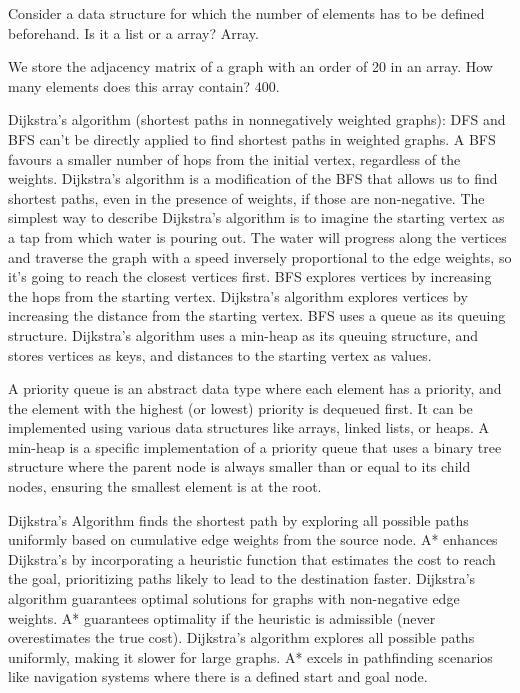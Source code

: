 Consider a data structure for which the number of elements has to be defined beforehand. Is it a list or a array? Array.

We store the adjacency matrix of a graph with an order of 20 in an array. How many elements does this array contain? $400$.

Dijkstra's algorithm (shortest paths in nonnegatively weighted graphs):
DFS and BFS can't be directly applied to find shortest paths in weighted graphs.
A BFS favours a smaller number of hops from the initial vertex, regardless of the weights.
Dijkstra's algorithm is a modification of the BFS that allows us to find shortest paths, even in the presence of weights, if those are non-negative.
The simplest way to describe Dijkstra's algorithm is to imagine the starting vertex as a tap from which water is pouring out. The water will progress along the vertices and traverse the graph with a speed inversely proportional to the edge weights, so it's going to reach the closest vertices first.
BFS explores vertices by increasing the hops from the starting vertex. Dijkstra's algorithm explores vertices by increasing the distance from the starting vertex.
BFS uses a queue as its queuing structure. Dijkstra's algorithm uses a min-heap as its queuing structure, and stores vertices as keys, and distances to the starting vertex as values.

A priority queue is an abstract data type where each element has a priority, and the element with the highest (or lowest) priority is dequeued first. It can be implemented using various data structures like arrays, linked lists, or heaps.
A min-heap is a specific implementation of a priority queue that uses a binary tree structure where the parent node is always smaller than or equal to its child nodes, ensuring the smallest element is at the root.

Dijkstra's Algorithm finds the shortest path by exploring all possible paths uniformly based on cumulative edge weights from the source node.
A* enhances Dijkstra's by incorporating a heuristic function that estimates the cost to reach the goal, prioritizing paths likely to lead to the destination faster.
Dijkstra's algorithm guarantees optimal solutions for graphs with non-negative edge weights. A* guarantees optimality if the heuristic is admissible (never overestimates the true cost).
Dijkstra's algorithm explores all possible paths uniformly, making it slower for large graphs. A* excels in pathfinding scenarios like navigation systems where there is a defined start and goal node.

